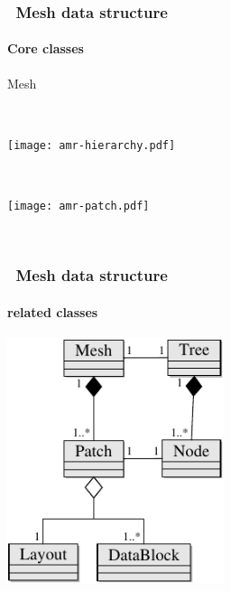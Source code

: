 \begin{frame}[fragile] 
\frametitle{\cello\ Mesh data structure}
\framesubtitle{Core  classes}
\begin{center}
\begin{minipage}{2.2in}
\centerline{ Mesh} \ \\
\centerline{\texttt{[image: amr-hierarchy.pdf]}}
\end{minipage} \ \\ \vspace{0.1in}
\begin{minipage}{2.2in}
\centerline{\texttt{[image: amr-patch.pdf]}}
\end{minipage} \ \\
\end{center}
\end{frame}

\begin{frame}[fragile] 
\frametitle{\cello\ Mesh data structure}
\framesubtitle{ related classes}
\centerline{\includegraphics[width=2.5in]{uml/amr.pdf}}

\end{frame}

